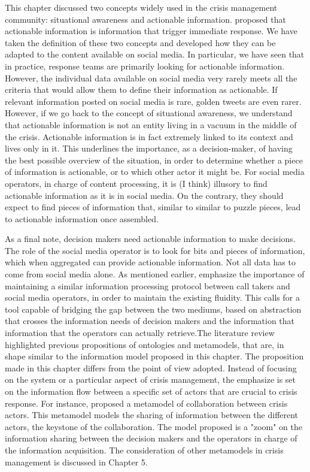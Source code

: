 This chapter discussed two concepts widely used in the crisis management community: situational awareness and actionable information.
\textcite{zadeSituationalAwarenessActionability2018} proposed that actionable information is information that trigger immediate response.
We have taken the definition of these two concepts and developed how they can be adapted to the content available on social media.
In particular, we have seen that in practice, response teams are primarily looking for actionable information.
However, the individual data available on social media very rarely meets all the criteria that would allow them to define their information as actionable.
If relevant information posted on social media is rare, golden tweets are even rarer.
However, if we go back to the concept of situational awareness, we understand that actionable information is not an entity living in a vacuum in the middle of the crisis.
Actionable information is in fact extremely linked to its context and lives only in it.
This underlines the importance, as a decision-maker, of having the best possible overview of the situation, in order to determine
whether a piece of information is actionable, or to which other actor it might be.
For social media operators, in charge of content processing, it is (I think) illusory to find actionable information as it is in social media.
On the contrary, they should expect to find pieces of information that, similar to
similar to puzzle pieces, lead to actionable information once assembled.

As a final note, decision makers need actionable information to make decisions.
The role of the social media operator is to look for bits and pieces of information, which when aggregated can provide actionable information.
Not all data has to come from social media alone.
As mentioned earlier, \textcite{graceRolePlayingNext2019} emphasize the importance of
maintaining a similar information processing protocol between call takers and social media
operators, in order to maintain the existing fluidity.
This calls for a tool capable of bridging the gap between the two mediums, based on
abstraction that crosses the information needs of decision makers and the information that
information that the operators can actually retrieve.The literature review highlighted previous
propositions of ontologies and metamodels, that are, in shape similar to the information model proposed in this chapter.
The proposition made in this chapter differs from the point of view adopted.
Instead of focusing on the system or a particular aspect of crisis management,
the emphasize is set on the information flow between a specific set of actors that are crucial to crisis response.
For instance, \textcite{benabenMetamodelKnowledgeManagement2016} proposed a metamodel of collaboration between crisis actors.
This metamodel models the sharing of information between the different actors, the keystone of the collaboration.
The model proposed is a "zoom" on the information sharing between the decision makers and the operators in charge of the information acquisition.
The consideration of other metamodels in crisis management is discussed in Chapter 5.

